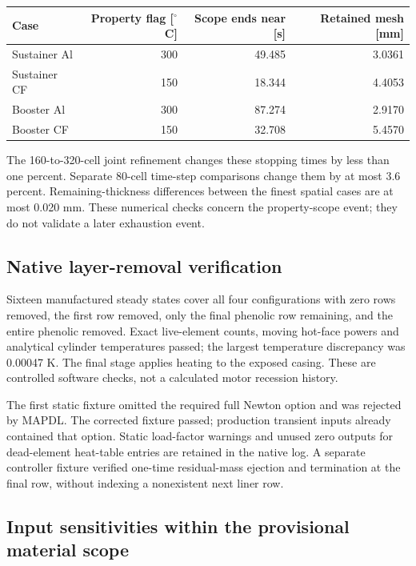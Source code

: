 \documentclass[oneside,openany]{amsdtx}
\begin{document}
\begin{table}[H]\centering\small\begin{tabular}{lrrr}\toprule Case & Property flag [$^\circ$C] & Scope ends near [s] & Retained mesh [mm]\\\midrule

Sustainer Al & 300 & 49.485 & 3.0361 \\
Sustainer CF & 150 & 18.344 & 4.4053 \\
Booster Al & 300 & 87.274 & 2.9170 \\
Booster CF & 150 & 32.708 & 5.4570 \\

\bottomrule\end{tabular}\end{table}

The 160-to-320-cell joint refinement changes these stopping times by less than one percent. Separate 80-cell time-step comparisons change them by at most 3.6 percent. Remaining-thickness differences between the finest spatial cases are at most 0.020 mm. These numerical checks concern the property-scope event; they do not validate a later exhaustion event.

\subsection{Native layer-removal verification}

Sixteen manufactured steady states cover all four configurations with zero rows removed, the first row removed, only the final phenolic row remaining, and the entire phenolic removed. Exact live-element counts, moving hot-face powers and analytical cylinder temperatures passed; the largest temperature discrepancy was 0.00047 K. The final stage applies heating to the exposed casing. These are controlled software checks, not a calculated motor recession history.

The first static fixture omitted the required full Newton option and was rejected by MAPDL. The corrected fixture passed; production transient inputs already contained that option. Static load-factor warnings and unused zero outputs for dead-element heat-table entries are retained in the native log. A separate controller fixture verified one-time residual-mass ejection and termination at the final row, without indexing a nonexistent next liner row.

\subsection{Input sensitivities within the provisional material scope}
\end{document}
